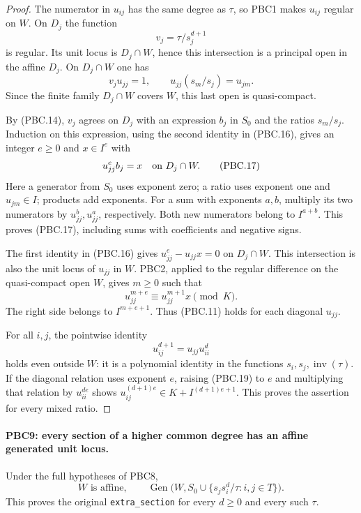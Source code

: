 \documentclass[11pt,a4paper]{article}
\numberwithin{equation}{section}
\theoremstyle{remark}\newtheorem{remark}[theorem]{Remark}
\begin{document}
\begin{proof}
The numerator in $u_{ij}$ has the same degree as $\tau$, so
PBC1 makes $u_{ij}$ regular on $W$.  On $D_j$ the function
\[
 v_j=\tau/s_j^{d+1}
\]
is regular.  Its unit locus is $D_j\cap W$, hence this
intersection is a principal open in the affine $D_j$.
On $D_j\cap W$ one has
\[
 v_ju_{jj}=1,\qquad
 u_{jj}(s_m/s_j)=u_{jm}.
                                                        \tag{PBC.16}
\]
Since the finite family $D_j\cap W$ covers $W$, this last open
is quasi-compact.

By (PBC.14), $v_j$ agrees on $D_j$ with an expression $b_j$
in $S_0$ and the ratios $s_m/s_j$.  Induction on this expression,
using the second identity in (PBC.16), gives an integer $e\ge0$
and $x\in I^e$ with
\[
 u_{jj}^e b_j=x\quad\hbox{on }D_j\cap W.
                                                        \tag{PBC.17}
\]
Here a generator from $S_0$ uses exponent zero; a ratio uses
exponent one and $u_{jm}\in I$; products add exponents.
For a sum with exponents $a,b$, multiply its two numerators
by $u_{jj}^b,u_{jj}^a$, respectively.  Both new numerators
belong to $I^{a+b}$.  This proves (PBC.17), including sums
with coefficients and negative signs.

The first identity in (PBC.16) gives
$u_{jj}^e-u_{jj}x=0$ on $D_j\cap W$.
This intersection is also the unit locus of $u_{jj}$ in $W$.
PBC2, applied to the regular difference on the quasi-compact
open $W$, gives $m\ge0$ such that
\[
 u_{jj}^{m+e}
       \equiv u_{jj}^{m+1}x \pmod K.
                                                        \tag{PBC.18}
\]
The right side belongs to $I^{m+e+1}$.  Thus (PBC.11)
holds for each diagonal $u_{jj}$.

For all $i,j$, the pointwise identity
\[
 u_{ij}^{d+1}=u_{jj}u_{ii}^{d}
                                                        \tag{PBC.19}
\]
holds even outside $W$: it is a polynomial identity in the
functions $s_i,s_j,\operatorname{inv}(\tau)$.
If the diagonal relation uses exponent $e$, raising
(PBC.19) to $e$ and multiplying that relation by $u_{ii}^{de}$
shows
$u_{ij}^{(d+1)e}\in K+I^{(d+1)e+1}$.
This proves the assertion for every mixed ratio.
\end{proof}

\paragraph{PBC9: every section of a higher common degree has an affine generated unit locus.}
\label{claim:PBC9}
Under the full hypotheses of PBC8,
\[
 W\text{ is affine},\qquad
 \operatorname{Gen}\bigl(W,S_0\cup\{s_j s_i^d/\tau:i,j\in T\}\bigr).
                                                        \tag{PBC.20}
\]
This proves the original \texttt{extra\_\allowbreak section} for every
$d\ge0$ and every such $\tau$.
\end{document}
